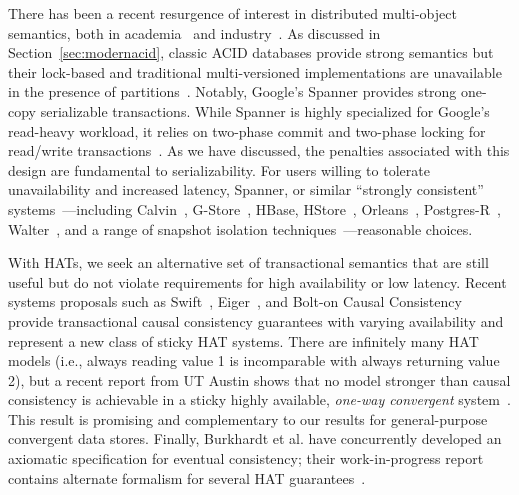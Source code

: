 There has been a recent resurgence of interest in distributed
multi-object semantics, both in academia~\cite{kraska-s3, gstore,
  eiger, walter,calvin, swift} and industry~\cite{orleans,spanner}. As
discussed in Section~\ref{sec:modernacid}, classic ACID databases
provide strong semantics but their lock-based and traditional
multi-versioned implementations are unavailable in the presence of
partitions~\cite{bernstein-book, gray-isolation}. Notably, Google's
Spanner provides strong one-copy serializable transactions. While
Spanner is highly specialized for Google's read-heavy workload, it
relies on two-phase commit and two-phase locking for read/write
transactions~\cite{spanner}. As we have discussed, the penalties
associated with this design are fundamental to serializability. For
users willing to tolerate unavailability and increased latency,
Spanner, or similar ``strongly consistent''
systems~\cite{kemme-classification}---including Calvin~\cite{calvin},
G-Store~\cite{gstore}, HBase, HStore~\cite{hstore},
Orleans~\cite{orleans}, Postgres-R~\cite{kemme-thesis},
Walter~\cite{walter}, and a range of snapshot isolation
techniques~\cite{daudjee-session}---reasonable
choices.

With HATs, we seek an alternative set of transactional semantics that
are still useful but do not violate requirements for high availability
or low latency. Recent systems proposals such as Swift~\cite{swift},
Eiger~\cite{eiger}, and Bolt-on Causal Consistency~\cite{bolton}
provide transactional causal consistency guarantees with varying
availability and represent a new class of sticky HAT systems. There
are infinitely many HAT models (i.e., always reading value 1 is
incomparable with always returning value 2), but a recent report from
UT Austin shows that no model stronger than causal consistency is
achievable in a sticky highly available, \textit{one-way convergent}
system~\cite{cac}. This result is promising and complementary to our
results for general-purpose convergent data stores. Finally, Burkhardt
et al. have concurrently developed an axiomatic specification for
eventual consistency; their work-in-progress report contains alternate
formalism for several HAT guarantees~\cite{burkhardt-txns}.







